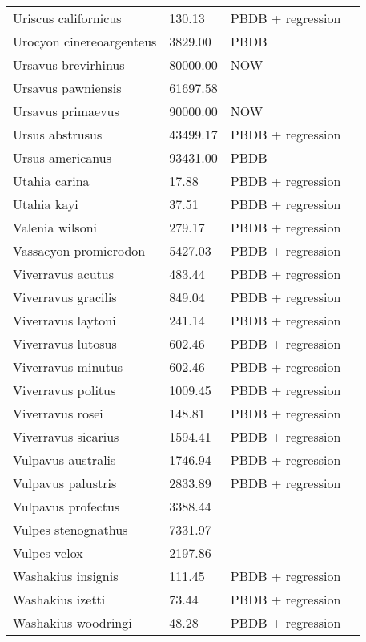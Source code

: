 \documentclass{article}
\begin{document}
\begin{center}
\begin{longtable}{p{} p{} p{} p{}}
    Uriscus californicus & 130.13 & PBDB + regression &  \\ 
    Urocyon cinereoargenteus & 3829.00 & PBDB &  \\ 
    Ursavus brevirhinus & 80000.00 & NOW &  \\ 
    Ursavus pawniensis & 61697.58 & \cite{Tomiya2013} &  \\ 
    Ursavus primaevus & 90000.00 & NOW &  \\ 
    Ursus abstrusus & 43499.17 & PBDB + regression &  \\ 
    Ursus americanus & 93431.00 & PBDB &  \\ 
    Utahia carina & 17.88 & PBDB + regression &  \\ 
    Utahia kayi & 37.51 & PBDB + regression &  \\ 
    Valenia wilsoni & 279.17 & PBDB + regression &  \\ 
    Vassacyon promicrodon & 5427.03 & PBDB + regression &  \\ 
    Viverravus acutus & 483.44 & PBDB + regression &  \\ 
    Viverravus gracilis & 849.04 & PBDB + regression &  \\ 
    Viverravus laytoni & 241.14 & PBDB + regression &  \\ 
    Viverravus lutosus & 602.46 & PBDB + regression &  \\ 
    Viverravus minutus & 602.46 & PBDB + regression &  \\ 
    Viverravus politus & 1009.45 & PBDB + regression &  \\ 
    Viverravus rosei & 148.81 & PBDB + regression &  \\ 
    Viverravus sicarius & 1594.41 & PBDB + regression &  \\ 
    Vulpavus australis & 1746.94 & PBDB + regression &  \\ 
    Vulpavus palustris & 2833.89 & PBDB + regression &  \\ 
    Vulpavus profectus & 3388.44 & \cite{Williamson2013} &  \\ 
    Vulpes stenognathus & 7331.97 & \cite{Tomiya2013} &  \\ 
    Vulpes velox & 2197.86 & \cite{Smith2004} &  \\ 
    Washakius insignis & 111.45 & PBDB + regression &  \\ 
    Washakius izetti & 73.44 & PBDB + regression &  \\ 
    Washakius woodringi & 48.28 & PBDB + regression &  \\ 

\end{longtable}
\end{center}
\end{document}
